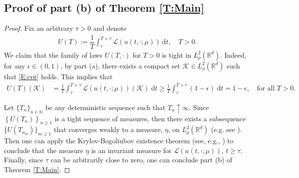 \documentclass[12pt]{report}
\theoremstyle{plain}
\theoremstyle{definition}
\numberwithin{equation}{section}
\newcommand{\R}{\mathbb{R}}
\newcommand{\ud}{\ensuremath{ \mathrm{d} }}
\begin{document}
\subsection{Proof of part (b) of Theorem \ref{T:Main}}
\begin{proof}
	Fix an arbitrary $\tau>0$ and denote
	\begin{align*}
	U(T) := \dfrac{1}{T}\int_{\tau}^{T+\tau} \mathcal{L}\left(u(t,\cdot;\mu)\right)\: \ud t, \quad T>0.
	\end{align*}
	We claim that the family of laws $U(T,\cdot)$ for $T > 0$ is tight in $L^2_{\rho}(\R^d)$. Indeed,
	for any $\epsilon\in (0,1)$, by part (a), there exists a compact set $\mathcal{K}\in
	L_\rho^2(\R^d)$ such that \eqref{E:cpt} holds. This implies that
	\begin{align*}
	U(T)\left(\mathcal{K}\right)
	& = \frac{1}{T} \int_{\tau}^{T + \tau} \mathscr{L}(u(t,\cdot;\mu))\left(\mathcal{K}\right) \; \ud t
	\ge \frac{1}{T} \int_{\tau}^{T + \tau} (1-\epsilon) \; \ud t
	= 1-\epsilon, \quad \text{for all $T>0$}.
	\end{align*}
	
	Let $\{T_n\}_{n\in \mathbb{N}}$ be any deterministic sequence such that $T_n\uparrow \infty$.
	Since $\left\{U(T_n)\right\}_{n\ge 1}$ is a tight sequence of measures, then there exists a subsequence
	$\{U\left(T_{n_m}\right)\}_{m\ge 1}$ that converges weakly to a measure, $\eta$, on
	$L_\rho^2(\R^d)$ (e.g. see \cite[Theorem 5.1]{billingsley:99:convergence}). Then one can apply the Krylov-Bogoliubov existence theorem (see, e.g.,
	\cite[Theorem 11.7]{da-prato.zabczyk:14:stochastic}) to conclude that the measure $\eta$ is an
	invariant measure for $\mathscr{L}(u(t,\cdot;\mu))$, $t\ge \tau$. Finally, since $\tau$ can be arbitrarily close to zero, one can conclude part (b) of Theorem \ref{T:Main}.
\end{proof}




%


%
%


\printbibliography[title={References}]


\end{document}
